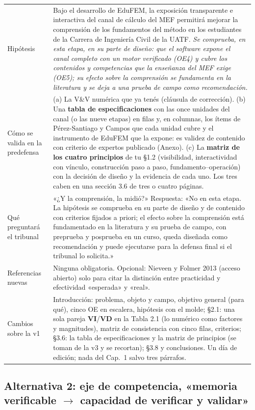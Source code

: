 \documentclass[11pt,a4paper]{article}
\newcommand{\vi}{\textbf{VI}}
\newcommand{\vd}{\textbf{VD}}
\begin{document}
\begin{longtable}{L{3.4cm}L{12.4cm}}
Hipótesis & Bajo el desarrollo de EduFEM, la exposición transparente e interactiva del canal de cálculo del MEF permitirá mejorar la comprensión de los fundamentos del método en los estudiantes de la Carrera de Ingeniería Civil de la UATF. \emph{Se comprueba, en esta etapa, en su parte de diseño: que el software expone el canal completo con un motor verificado (OE4) y cubre los contenidos y competencias que la enseñanza del MEF exige (OE5); su efecto sobre la comprensión se fundamenta en la literatura y se deja a una prueba de campo como recomendación.} \\
Cómo se valida en la predefensa & (a) La V\&V numérica que ya tenés (cláusula de corrección). (b) Una \textbf{tabla de especificaciones} con las once unidades del canal (o las nueve etapas) en filas y, en columnas, los ítems de Pérez-Santiago y Campos que cada unidad cubre y el instrumento de EduFEM que la expone: es validez de contenido con criterio de expertos publicado (Anexo). (c) La \textbf{matriz de los cuatro principios} de tu §1.2 (visibilidad, interactividad con vínculo, construcción paso a paso, fundamento--operación) con la decisión de diseño y la evidencia de cada uno. Los tres caben en una sección 3.6 de tres o cuatro páginas. \\
Qué preguntará el tribunal & «¿Y la comprensión, la midió?» Respuesta: «No en esta etapa. La hipótesis se comprueba en su parte de diseño y de contenido con criterios fijados a priori; el efecto sobre la comprensión está fundamentado en la literatura y su prueba de campo, con preprueba y posprueba en un curso, queda diseñada como recomendación y puede ejecutarse para la defensa final si el tribunal lo solicita.» \\
Referencias nuevas & Ninguna obligatoria. Opcional: Nieveen y Folmer 2013 (acceso abierto) solo para citar la distinción entre practicidad y efectividad «esperada» y «real». \\
Cambios sobre la v1 & Introducción: problema, objeto y campo, objetivo general (para qué), cinco OE en escalera, hipótesis con el molde; §2.1: una sola pareja \vi/\vd{} en la Tabla 2.1 (lo numérico como factores y magnitudes), matriz de consistencia con cinco filas, criterios; §3.6: la tabla de especificaciones y la matriz de principios (se toman de la v3 y se recortan); §3.8 y conclusiones. Un día de edición; nada del Cap.~1 salvo tres párrafos. \\
\bottomrule
\end{longtable}

\subsection{Alternativa 2: eje de competencia, «memoria verificable $\to$ capacidad de verificar y validar»}
\end{document}
